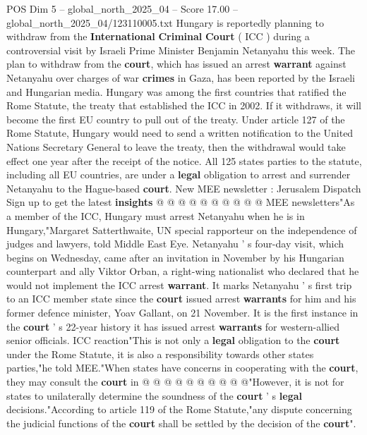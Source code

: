 \begin{textsample}{POS Dim 5 – global\_north\_2025\_04 – Score 17.00 – global\_north\_2025\_04/123110005.txt}  \label{ex:f5_pos_104}
Hungary is reportedly planning to withdraw from the \textbf{International} \textbf{Criminal} \textbf{Court} ( ICC ) during a controversial visit by Israeli Prime Minister Benjamin Netanyahu this week.
The plan to withdraw from the \textbf{court}, which has issued an arrest \textbf{warrant} against Netanyahu over charges of war \textbf{crimes} in Gaza, has been reported by the Israeli and Hungarian media.
Hungary was among the first countries that ratified the Rome Statute, the treaty that established the ICC in 2002.
If it withdraws, it will become the first EU country to pull out of the treaty.
Under article 127 of the Rome Statute, Hungary would need to send a written notification to the United Nations Secretary General to leave the treaty, then the withdrawal would take effect one year after the receipt of the notice.
All 125 states parties to the statute, including all EU countries, are under a \textbf{legal} obligation to arrest and surrender Netanyahu to the Hague-based \textbf{court}.
New MEE newsletter : Jerusalem Dispatch Sign up to get the latest \textbf{insights} @ @ @ @ @ @ @ @ @ @ MEE newsletters"As a member of the ICC, Hungary must arrest Netanyahu when he is in Hungary,"Margaret Satterthwaite, UN special rapporteur on the independence of judges and lawyers, told Middle East Eye.
Netanyahu ' s four-day visit, which begins on Wednesday, came after an invitation in November by his Hungarian counterpart and ally Viktor Orban, a right-wing nationalist who declared that he would not implement the ICC arrest \textbf{warrant}.
It marks Netanyahu ' s first trip to an ICC member state since the \textbf{court} issued arrest \textbf{warrants} for him and his former defence minister, Yoav Gallant, on 21 November.
It is the first instance in the \textbf{court} ' s 22-year history it has issued arrest \textbf{warrants} for western-allied senior officials.
ICC reaction"This is not only a \textbf{legal} obligation to the \textbf{court} under the Rome Statute, it is also a responsibility towards other states parties,"he told MEE."When states have concerns in cooperating with the \textbf{court}, they may consult the \textbf{court} in @ @ @ @ @ @ @ @ @ @"However, it is not for states to unilaterally determine the soundness of the \textbf{court} ' s \textbf{legal} decisions."According to article 119 of the Rome Statute,"any dispute concerning the judicial functions of the \textbf{court} shall be settled by the decision of the \textbf{court}".

\end{textsample}
